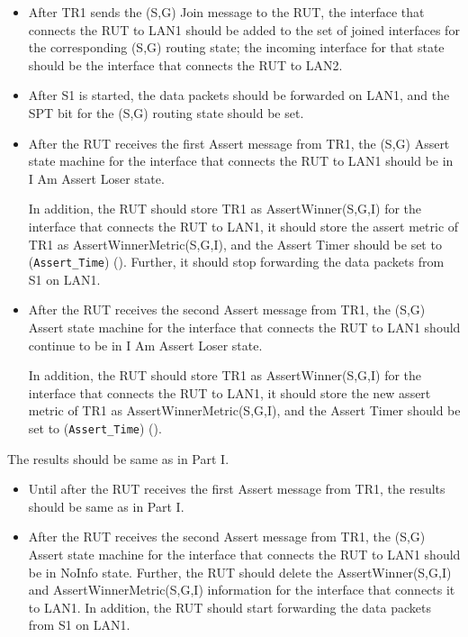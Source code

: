 \documentclass[11pt]{report}
\begin{document}
\begin{itemize}

  \item After TR1 sends the (S,G) Join message to the RUT, the interface that
  connects the RUT to LAN1 should be added to the set of joined interfaces for
  the corresponding (S,G) routing state; the incoming interface for that state
  should be the interface that connects the RUT to LAN2.

  \item After S1 is started, the data packets should be forwarded on LAN1,
  and the SPT bit for the (S,G) routing state should be set.

  \item After the RUT receives the first Assert message from TR1, the (S,G)
  Assert state machine for the interface that connects the RUT to LAN1 should
  be in I Am Assert Loser state.

  In addition, the RUT should store TR1 as AssertWinner(S,G,I) for the
  interface that connects the RUT to LAN1, it should store the assert metric
  of TR1 as AssertWinnerMetric(S,G,I), and the Assert Timer should be set to
  (\verb=Assert_Time=) ({\PimsmAssertTime}).
  Further, it should stop forwarding the data packets from S1 on LAN1.

  \item After the RUT receives the second Assert message from TR1, the (S,G)
  Assert state machine for the interface that connects the RUT to LAN1 should
  continue to be in I Am Assert Loser state.

  In addition, the RUT should store TR1 as AssertWinner(S,G,I) for the
  interface that connects the RUT to LAN1, it should store the new assert
  metric of TR1 as AssertWinnerMetric(S,G,I), and the Assert Timer should be
  set to (\verb=Assert_Time=) ({\PimsmAssertTime}).

\end{itemize}


The results should be same as in Part I.


\begin{itemize}

  \item Until after the RUT receives the first Assert message from TR1, the
  results should be same as in Part I.

  \item After the RUT receives the second Assert message from TR1, the (S,G)
  Assert state machine for the interface that connects the RUT to LAN1 should
  be in NoInfo state.
  Further, the RUT should delete the AssertWinner(S,G,I) and
  AssertWinnerMetric(S,G,I) information for the interface that connects it to
  LAN1.
  In addition, the RUT should start forwarding the data packets from S1 on
  LAN1.

\end{itemize}
\end{document}
